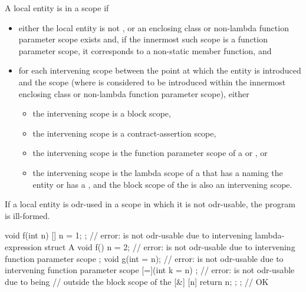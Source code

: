 \pnum
A local entity
is  in a scope if
\begin{itemize}
\item either the local entity is not , or
an enclosing class or non-lambda function parameter scope exists and,
if the innermost such scope is a function parameter scope,
it corresponds to a non-static member function, and
\item
for each intervening scope
between the point at which the entity is introduced and the scope
(where  is considered to be introduced
within the innermost enclosing class or non-lambda function parameter scope),
either
\begin{itemize}
\item the intervening scope is a block scope,
\item the intervening scope is a contract-assertion scope,
\item the intervening scope is the function parameter scope of
a  or , or
\item the intervening scope is the lambda scope of
a 
that has a 
naming the entity or has a , and
the block scope of the 
is also an intervening scope.
\end{itemize}
\end{itemize}

If a local entity is odr-used
in a scope in which it is not odr-usable,
the program is ill-formed.
\begin{example}
\begin{codeblock}
void f(int n) {
  [] { n = 1; };                // error:  is not odr-usable due to intervening lambda-expression
  struct A {
    void f() { n = 2; }         // error:  is not odr-usable due to intervening function parameter scope
  };
  void g(int = n);              // error:  is not odr-usable due to intervening function parameter scope
  [=](int k = n) {};            // error:  is not odr-usable due to being
                                // outside the block scope of the 
  [&] { [n]{ return n; }; };    // OK
}
\end{codeblock}
\end{example}

